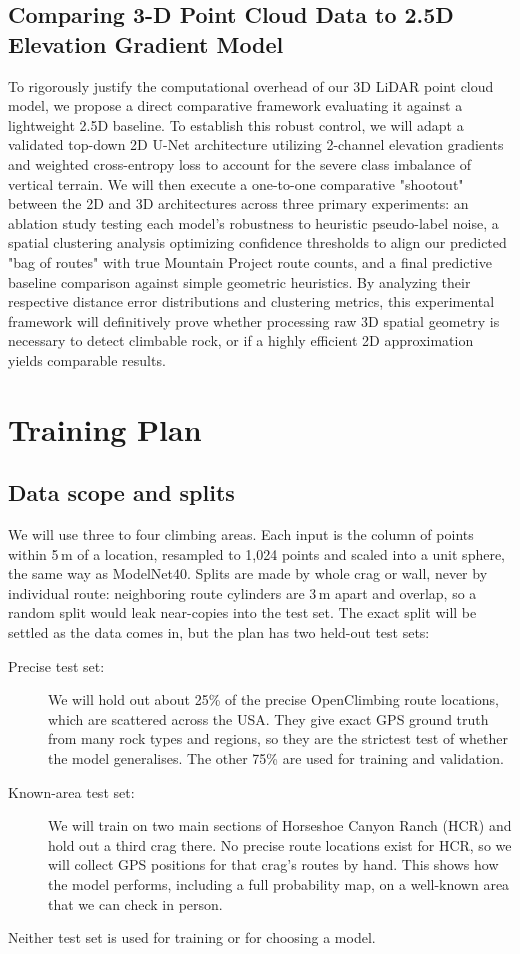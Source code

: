 \documentclass{mva2011}
\begin{document}
\subsection{Comparing 3-D Point Cloud Data to 2.5D Elevation Gradient Model}
To rigorously justify the computational overhead of our 3D LiDAR point cloud model, we propose a direct comparative framework evaluating it against a lightweight 2.5D baseline. To establish this robust control, we will adapt a validated top-down 2D U-Net architecture utilizing 2-channel elevation gradients and weighted cross-entropy loss to account for the severe class imbalance of vertical terrain. We will then execute a one-to-one comparative "shootout" between the 2D and 3D architectures across three primary experiments: an ablation study testing each model's robustness to heuristic pseudo-label noise, a spatial clustering analysis optimizing confidence thresholds to align our predicted "bag of routes" with true Mountain Project route counts, and a final predictive baseline comparison against simple geometric heuristics. By analyzing their respective distance error distributions and clustering metrics, this experimental framework will definitively prove whether processing raw 3D spatial geometry is necessary to detect climbable rock, or if a highly efficient 2D approximation yields comparable results.

\section{Training Plan}
\subsection{Data scope and splits}
    We will use three to four climbing areas. Each input is the column of points within 5\,m of a location, resampled to 1,024 points and scaled into a unit sphere, the same way as ModelNet40. Splits are made by whole crag or wall, never by individual route: neighboring route cylinders are 3\,m apart and overlap, so a random split would leak near-copies into the test set. The exact split will be settled as the data comes in, but the plan has two held-out test sets:
    \begin{description}
    \item[Precise test set:] We will hold out about 25\% of the precise OpenClimbing route locations, which are scattered across the USA. They give exact GPS ground truth from many rock types and regions, so they are the strictest test of whether the model generalises. The other 75\% are used for training and validation.
    \item[Known-area test set:] We will train on two main sections of Horseshoe Canyon Ranch (HCR) and hold out a third crag there. No precise route locations exist for HCR, so we will collect GPS positions for that crag's routes by hand. This shows how the model performs, including a full probability map, on a well-known area that we can check in person.
    \end{description}
    Neither test set is used for training or for choosing a model.
\end{document}
